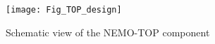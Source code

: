 \begin{figure}[ht]
\begin{center}
\vspace{0cm}
\texttt{[image: Fig\_TOP\_design]}
\caption{Schematic view of the NEMO-TOP component}
\label{topdesign}
\end{center}
\end{figure}

